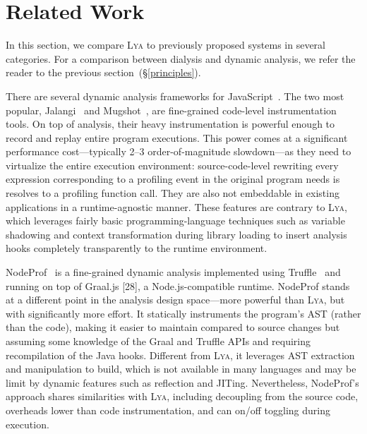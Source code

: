 \documentclass[letterpaper,twocolumn,10pt]{article}
\newcommand{\heading}[1]{\vspace{2pt}\noindent\textbf{#1}\enspace}
\newcommand{\sx}[1]{(\S\ref{#1})}
\newcommand{\sys}{{\scshape Lya}\xspace}
\begin{document}
\section{Related Work}
\label{rw}

In this section, we compare \sys to previously proposed systems in several categories.
For a comparison between dialysis and dynamic analysis, we refer the reader to the previous section~\sx{principles}.

There are several dynamic analysis frameworks for JavaScript~\cite{javascript1, javascript2, javascript3, mugshot, jalangi}.
The two most popular, Jalangi~\cite{jalangi} and Mugshot~\cite{mugshot}, are fine-grained code-level instrumentation tools.
On top of analysis, their heavy instrumentation is powerful enough to record and replay entire program executions.
This power comes at a significant performance cost---typically 2--3 order-of-magnitude slowdown---as they need to virtualize the entire execution environment:
  source-code-level rewriting every expression corresponding to a profiling event in the original program needs is resolves to a profiling function call.
They are also not embeddable in existing applications in a runtime-agnostic manner.
These features are contrary to \sys, which leverages fairly basic programming-language techniques such as variable shadowing and context transformation during library loading to insert analysis hooks completely transparently to the runtime environment.

NodeProf~\cite{javascript3} is a fine-grained dynamic analysis implemented using Truffle~\cite{} and running on top of Graal.js [28], a Node.js-compatible runtime.
NodeProf stands at a different point in the analysis design space---more powerful than \sys, but with significantly more effort.
It statically instruments the program's AST (rather than the code), making it easier to maintain compared to source changes but assuming some knowledge of the Graal and Truffle APIs and requiring recompilation of the Java hooks.
Different from \sys, it leverages AST extraction and manipulation to build, which is not available in many languages and may be limit by dynamic features such as reflection and JITing.
Nevertheless, NodeProf's approach shares similarities with \sys, including decoupling from the source code, overheads lower than code instrumentation, and can on/off toggling during execution.
\end{document}

